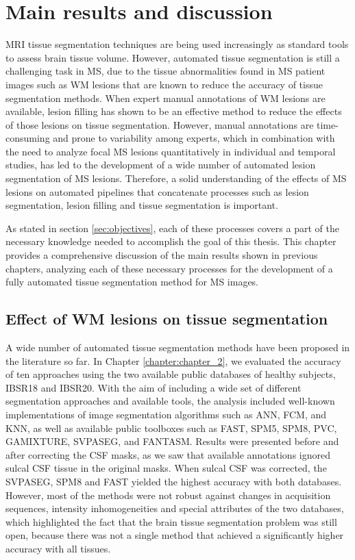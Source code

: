 
\chapter{Main results and discussion}

MRI tissue segmentation techniques are being used increasingly as standard tools to assess brain tissue volume. However, automated tissue segmentation is still a challenging task in MS, due to the tissue abnormalities found in MS patient images such as WM lesions that are known to reduce the accuracy of tissue segmentation methods. When expert manual annotations of WM lesions are available, lesion filling has shown to be an effective method to reduce the effects of those lesions on tissue segmentation. However, manual annotations are time-consuming and prone to variability among experts, which in combination with the need to analyze focal MS lesions quantitatively in individual and temporal studies, has led to the development of a wide number of automated lesion segmentation of MS lesions. Therefore, a solid understanding of the effects of MS lesions on automated pipelines that concatenate processes such as lesion segmentation, lesion filling and tissue segmentation is important. 

As stated in section \ref{sec:objectives}, each of these processes covers a part of the necessary knowledge needed to accomplish the goal of this thesis. This chapter provides a comprehensive discussion of the main results shown in previous chapters, analyzing each of these necessary processes for the development of a fully automated tissue segmentation method for MS images.

\section{Effect of WM lesions on tissue segmentation}

A wide number of automated tissue segmentation methods have been proposed in the literature so far. In Chapter \ref{chapter:chapter_2}, we evaluated the accuracy of ten approaches using the two available public databases of healthy subjects, IBSR18 and IBSR20. With the aim of including a wide set of different segmentation approaches and available tools, the analysis included well-known implementations of image segmentation algorithms such as ANN, FCM, and KNN, as well as available public toolboxes such as FAST, SPM5, SPM8, PVC, GAMIXTURE, SVPASEG, and FANTASM. Results were presented before and after correcting the CSF masks, as we saw that available annotations ignored sulcal CSF tissue in the original masks. When sulcal CSF was corrected, the SVPASEG, SPM8 and FAST yielded the highest accuracy with both databases.  However, most of the methods were not robust against changes in acquisition sequences, intensity inhomogeneities and special attributes of the two databases,  which highlighted the fact that the brain tissue segmentation problem was still open, because there was not a single method that achieved a significantly higher accuracy with all tissues. 

